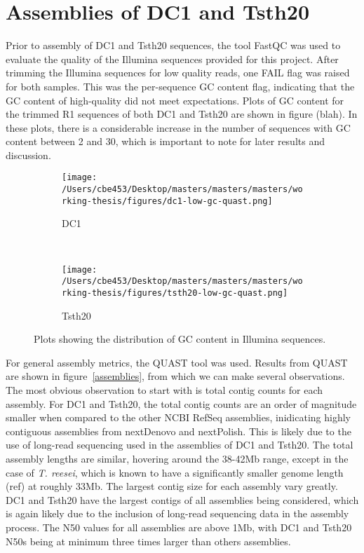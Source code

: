 \section{Assemblies of DC1 and Tsth20}

Prior to assembly of DC1 and Tsth20 sequences, the tool FastQC was
used to evaluate the quality of the Illumina sequences provided for
this project. After trimming the Illumina sequences for low quality
reads, one FAIL flag was raised for both samples. This was the
per-sequence GC content flag, indicating that the GC content of
high-quality did not meet expectations. Plots of GC content for the
trimmed R1 sequences of both DC1 and Tsth20 are shown in figure
(blah). In these plots, there is a considerable increase in the number
of sequences with GC content between 2 and 30, which is important to
note for later results and discussion.

\begin{figure}
  \centering
  \begin{subfigure}{0.8\textwidth}
    \texttt{[image: /Users/cbe453/Desktop/masters/masters/masters/working-thesis/figures/dc1-low-gc-quast.png]}
    \caption{DC1}
    \label{fig:dc1quast}
  \end{subfigure}
  \\
  \begin{subfigure}{0.8\textwidth}
  \texttt{[image: /Users/cbe453/Desktop/masters/masters/masters/working-thesis/figures/tsth20-low-gc-quast.png]}
    \caption{Tsth20}
    \label{fig:tsth20quast}
  \end{subfigure}
  \caption{Plots showing the distribution of GC content in Illumina
    sequences.}
  \label{fig:quast-lowgc}
\end{figure}

For general assembly metrics, the QUAST tool was used. Results from
QUAST are shown in figure~\ref{assemblies}, from which we can make
several observations. The most obvious observation to start with is
total contig counts for each assembly. For DC1 and Tsth20, the total
contig counts are an order of magnitude smaller when compared to the
other NCBI RefSeq assemblies, inidicating highly contiguous assemblies
from nextDenovo and nextPolish. This is likely due to the use of
long-read sequencing used in the assemblies of DC1 and Tsth20. The
total assembly lengths are similar, hovering around the 38-42Mb range,
except in the case of \textit{T. reesei}, which is known to have a
significantly smaller genome length (ref) at roughly 33Mb. The largest
contig size for each assembly vary greatly. DC1 and Tsth20 have the
largest contigs of all assemblies being considered, which is again
likely due to the inclusion of long-read sequencing data in the
assembly process. The N50 values for all assemblies are above 1Mb,
with DC1 and Tsth20 N50s being at minimum three times larger than
others assemblies.


